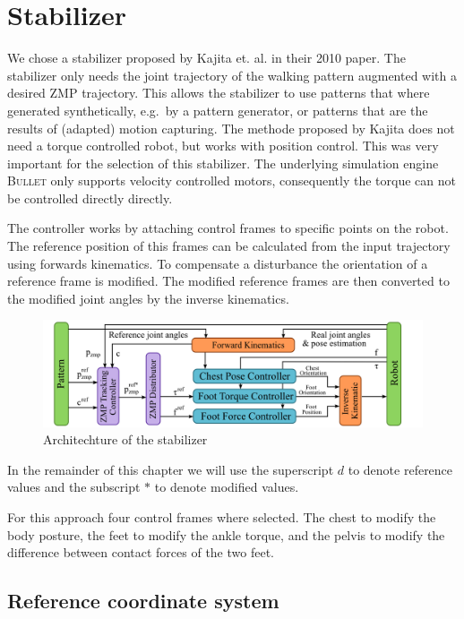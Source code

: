 \documentclass[english,ngerman]{KITreprt}
\newcommand{\name}[1]{\textsc{#1}}
\begin{document}
\section{Stabilizer}\label{section:stabilizer}

We chose a stabilizer proposed by Kajita et. al. in their 2010 paper.
\cite{kajita2010biped} The stabilizer only needs the joint trajectory of
the walking pattern augmented with a desired ZMP trajectory. This allows
the stabilizer to use patterns that where generated synthetically,
e.g.~by a pattern generator, or patterns that are the results of
(adapted) motion capturing. The methode proposed by Kajita does not need
a torque controlled robot, but works with position control. This was
very important for the selection of this stabilizer. The underlying
simulation engine \name{Bullet} only supports velocity controlled
motors, consequently the torque can not be controlled directly directly.

The controller works by attaching control frames to specific points on
the robot. The reference position of this frames can be calculated from
the input trajectory using forwards kinematics. To compensate a
disturbance the orientation of a reference frame is modified. The
modified reference frames are then converted to the modified joint
angles by the inverse kinematics.

\begin{figure}[tb]
\vspace*{-1em}
\includegraphics[width=\textwidth]{images/stabilizer_architechture.png}
\caption{Architechture of the stabilizer}
\label{img:archtitechture-stabiluzer}
\end{figure}

In the remainder of this chapter we will use the superscript $d$ to
denote reference values and the subscript $*$ to denote modified values.

For this approach four control frames where selected. The chest to
modify the body posture, the feet to modify the ankle torque, and the
pelvis to modify the difference between contact forces of the two feet.

\subsection{Reference coordinate
system}\label{reference-coordinate-system}
\end{document}
